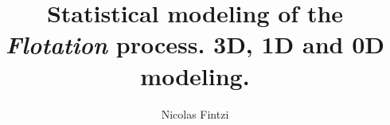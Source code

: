 \documentclass[12pt]{My_preprint}
\title{
    Statistical modeling of the \textit{Flotation} process.
    3D, 1D and 0D modeling.  
    }
\author[1,2]{Nicolas Fintzi}
\begin{document}
\maketitle

\begin{abstract}
\end{abstract}




\appendix
\end{document}
